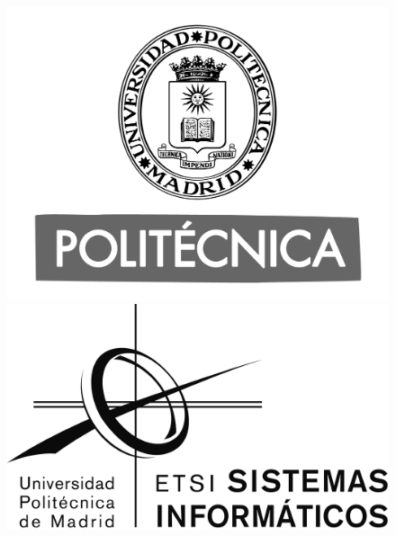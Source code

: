 \documentclass[a4paper]{report}
\begin{document}
\begin{titlepage}
\pagecolor{AzulCeleste}\afterpage{\nopagecolor}

\begin{figure}[!htb]
   \begin{minipage}{0.5\textwidth}
     \centering
     \includegraphics[width=1\textwidth]{logo_upm_bn.png}
   \end{minipage}\hfill
   \begin{minipage}{0.5\textwidth}
     \centering
     \includegraphics[width=1\textwidth]{logo_etsisi_bn.png}
   \end{minipage}
\end{figure}


\end{titlepage}
\end{document}
